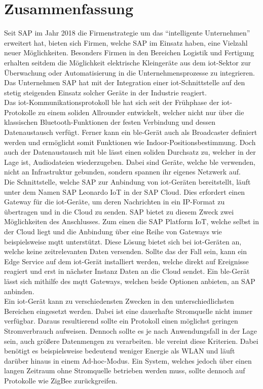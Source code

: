\section{Zusammenfassung}
\label{s:fazit}

\noindent Seit SAP im Jahr 2018 die Firmenstrategie um das "`intelligente Unternehmen"' erweitert hat, bieten sich Firmen, welche SAP im Einsatz haben, eine Vielzahl neuer Möglichkeiten. Besonders Firmen in den Bereichen Logistik und Fertigung erhalten seitdem die Möglichkeit elektrische Kleingeräte aus dem \ac{iot}-Sektor zur Überwachung oder Automatisierung in die Unternehmensprozesse zu integrieren. Das Unternehmen SAP hat mit der Integration einer \ac{iot}-Schnittstelle auf den stetig steigenden Einsatz solcher Geräte in der Industrie reagiert.\\
\noindent Das \ac{iot}-Kommunikationsprotokoll \ac{ble} hat sich seit der Frühphase der \ac{iot}-Protokolle zu einem soliden Allrounder entwickelt, welcher nicht nur über die klassischen Bluetooth-Funktionen der festen Verbindung und dessen Datenaustausch verfügt. Ferner kann ein \ac{ble}-Gerät auch als Broadcaster definiert werden und ermöglicht somit Funktionen wie Indoor-Positionsbestimmung. Doch auch der Datenaustausch mit \ac{ble} lässt einen soliden Durchsatz zu, welcher in der Lage ist, Audiodateien wiederzugeben. Dabei sind Geräte, welche \ac{ble} verwenden, nicht an Infrastruktur gebunden, sondern spannen ihr eigenes Netzwerk auf.\\ 
\noindent Die Schnittstelle, welche SAP zur Anbindung von \ac{iot}-Geräten bereitstellt, läuft unter dem Namen SAP Leonardo IoT in der SAP Cloud. Dies erfordert einen Gateway für die \ac{iot}-Geräte, um deren Nachrichten in ein IP-Format zu übertragen und in die Cloud zu senden. SAP bietet zu diesem Zweck zwei Möglichkeiten des Anschlusses. Zum einen die SAP Platform IoT, welche selbst in der Cloud liegt und die Anbindung über eine Reihe von Gateways wie beispielsweise \ac{mqtt} unterstützt. Diese Lösung bietet sich bei \ac{iot}-Geräten an, welche keine zeitrelevanten Daten versenden. Sollte das der Fall sein, kann ein Edge Service auf dem \ac{iot}-Gerät installiert werden, welche direkt auf Ereignisse reagiert und erst in nächster Instanz Daten an die Cloud sendet. Ein \ac{ble}-Gerät lässt sich mithilfe des \ac{mqtt} Gateways, welchen beide Optionen anbieten, an SAP anbinden.\\    
\noindent Ein \ac{iot}-Gerät kann zu verschiedensten Zwecken in den unterschiedlichsten Bereichen eingesetzt werden. Dabei ist eine dauerhafte Stromquelle nicht immer verfügbar. Daraus resultierend sollte ein Protokoll einen möglichst geringen Stromverbrauch aufweisen. Dennoch sollte es je nach Anwendungsfall in der Lage sein, auch größere Datenmengen zu verarbeiten. \ac{ble} vereint diese Kriterien. Dabei benötigt es beispielsweise bedeutend weniger Energie als WLAN und läuft darüber hinaus in einem Ad-hoc-Modus. Ein System, welches jedoch über einen langen Zeitraum ohne Stromquelle betrieben werden muss, sollte dennoch auf Protokolle wie ZigBee zurückgreifen.\\
